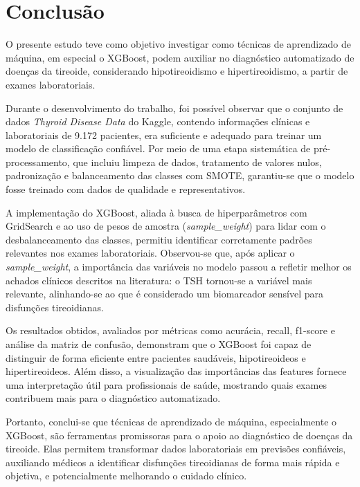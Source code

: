 \documentclass[11pt]{article}
\begin{document}
\section{Conclusão}

O presente estudo teve como objetivo investigar como técnicas de aprendizado de máquina, em especial o XGBoost, podem auxiliar no diagnóstico automatizado de doenças da tireoide, considerando hipotireoidismo e hipertireoidismo, a partir de exames laboratoriais.

Durante o desenvolvimento do trabalho, foi possível observar que o conjunto de dados \textit{Thyroid Disease Data} do Kaggle, contendo informações clínicas e laboratoriais de 9.172 pacientes, era suficiente e adequado para treinar um modelo de classificação confiável. Por meio de uma etapa sistemática de pré-processamento, que incluiu limpeza de dados, tratamento de valores nulos, padronização e balanceamento das classes com SMOTE, garantiu-se que o modelo fosse treinado com dados de qualidade e representativos.

A implementação do XGBoost, aliada à busca de hiperparâmetros com GridSearch e ao uso de pesos de amostra (\textit{sample\_weight}) para lidar com o desbalanceamento das classes, permitiu identificar corretamente padrões relevantes nos exames laboratoriais. Observou-se que, após aplicar o \textit{sample\_weight}, a importância das variáveis no modelo passou a refletir melhor os achados clínicos descritos na literatura: o TSH tornou-se a variável mais relevante, alinhando-se ao que é considerado um biomarcador sensível para disfunções tireoidianas.

Os resultados obtidos, avaliados por métricas como acurácia, recall, f1-score e análise da matriz de confusão, demonstram que o XGBoost foi capaz de distinguir de forma eficiente entre pacientes saudáveis, hipotireoideos e hipertireoideos. Além disso, a visualização das importâncias das features fornece uma interpretação útil para profissionais de saúde, mostrando quais exames contribuem mais para o diagnóstico automatizado.

Portanto, conclui-se que técnicas de aprendizado de máquina, especialmente o XGBoost, são ferramentas promissoras para o apoio ao diagnóstico de doenças da tireoide. Elas permitem transformar dados laboratoriais em previsões confiáveis, auxiliando médicos a identificar disfunções tireoidianas de forma mais rápida e objetiva, e potencialmente melhorando o cuidado clínico.

\newpage
\printbibliography
\end{document}

